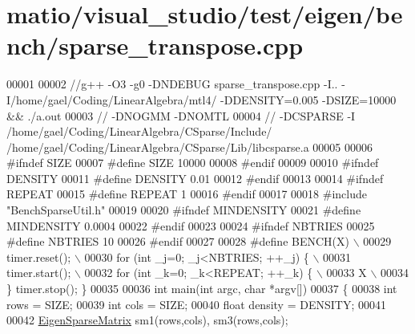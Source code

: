 \hypertarget{matio_2visual__studio_2test_2eigen_2bench_2sparse__transpose_8cpp_source}{}\section{matio/visual\+\_\+studio/test/eigen/bench/sparse\+\_\+transpose.cpp}
\label{matio_2visual__studio_2test_2eigen_2bench_2sparse__transpose_8cpp_source}

\begin{DoxyCode}
00001 
00002 \textcolor{comment}{//g++ -O3 -g0 -DNDEBUG  sparse\_transpose.cpp -I.. -I/home/gael/Coding/LinearAlgebra/mtl4/ -DDENSITY=0.005
       -DSIZE=10000 && ./a.out}
00003 \textcolor{comment}{// -DNOGMM -DNOMTL}
00004 \textcolor{comment}{// -DCSPARSE -I /home/gael/Coding/LinearAlgebra/CSparse/Include/
       /home/gael/Coding/LinearAlgebra/CSparse/Lib/libcsparse.a}
00005 
00006 \textcolor{preprocessor}{#ifndef SIZE}
00007 \textcolor{preprocessor}{#define SIZE 10000}
00008 \textcolor{preprocessor}{#endif}
00009 
00010 \textcolor{preprocessor}{#ifndef DENSITY}
00011 \textcolor{preprocessor}{#define DENSITY 0.01}
00012 \textcolor{preprocessor}{#endif}
00013 
00014 \textcolor{preprocessor}{#ifndef REPEAT}
00015 \textcolor{preprocessor}{#define REPEAT 1}
00016 \textcolor{preprocessor}{#endif}
00017 
00018 \textcolor{preprocessor}{#include "BenchSparseUtil.h"}
00019 
00020 \textcolor{preprocessor}{#ifndef MINDENSITY}
00021 \textcolor{preprocessor}{#define MINDENSITY 0.0004}
00022 \textcolor{preprocessor}{#endif}
00023 
00024 \textcolor{preprocessor}{#ifndef NBTRIES}
00025 \textcolor{preprocessor}{#define NBTRIES 10}
00026 \textcolor{preprocessor}{#endif}
00027 
00028 \textcolor{preprocessor}{#define BENCH(X) \(\backslash\)}
00029 \textcolor{preprocessor}{  timer.reset(); \(\backslash\)}
00030 \textcolor{preprocessor}{  for (int \_j=0; \_j<NBTRIES; ++\_j) \{ \(\backslash\)}
00031 \textcolor{preprocessor}{    timer.start(); \(\backslash\)}
00032 \textcolor{preprocessor}{    for (int \_k=0; \_k<REPEAT; ++\_k) \{ \(\backslash\)}
00033 \textcolor{preprocessor}{        X  \(\backslash\)}
00034 \textcolor{preprocessor}{  \} timer.stop(); \}}
00035 
00036 \textcolor{keywordtype}{int} main(\textcolor{keywordtype}{int} argc, \textcolor{keywordtype}{char} *argv[])
00037 \{
00038   \textcolor{keywordtype}{int} rows = SIZE;
00039   \textcolor{keywordtype}{int} cols = SIZE;
00040   \textcolor{keywordtype}{float} density = DENSITY;
00041 
00042   \hyperlink{group___sparse_core___module}{EigenSparseMatrix} sm1(rows,cols), sm3(rows,cols);

\end{DoxyCode}
